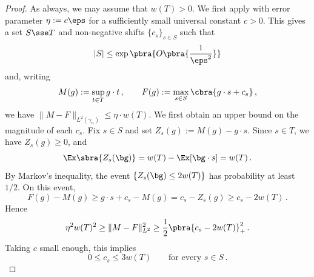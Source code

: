 \documentclass[11pt]{article}
\begin{document}
\begin{proof} 
	As always, we may assume that $w(T) > 0$. 
	We first apply  with error parameter $\eta:=c\eps$ for a sufficiently small universal constant $c>0$. 
	This gives a set $S\sse T$ and non-negative shifts $\{c_s\}_{s\in S}$ such that
	\[
		|S|
		\leq
		\exp\pbra{O\pbra{\frac1{\eps^2}}}
	\]
	and, writing
	\[
		M(g):=\sup_{t\in T}g\cdot t\,,
		\qquad
		F(g):=\max_{s\in S}\cbra{g\cdot s+c_s}\,,
	\]
	we have $\|M-F\|_{L^2(\gamma_n)} \leq \eta\cdot w(T)$. 
	We first obtain an upper bound on the magnitude of each $c_s$. 
	Fix $s\in S$ and set $Z_s(g):=M(g)-g\cdot s$.
	Since $s\in T$, we have $Z_s(g)\geq0$, and
	\[
		\Ex\sbra{Z_s(\bg)}
		=
		w(T)-\Ex[\bg\cdot s]
		=
		w(T)\,.
	\]
	By Markov's inequality, the event $\{Z_s(\bg)\leq2w(T)\}$ has probability at least $1/2$.
	On this event,
	\[
		F(g)-M(g)
		\geq
		g\cdot s+c_s-M(g)
		=
		c_s-Z_s(g)
		\geq
		c_s-2w(T)\,.
	\]
	Hence
	\[
		\eta^2 w(T)^2
		\geq
		\|M-F\|_{L^2}^2
		\geq
		\frac12\pbra{c_s-2w(T)}_+^2\,.
	\]
	Taking $c$ small enough, this implies
	\begin{equation} \label{eq:centered-shift-bound}
		0\leq c_s\leq 3w(T)
		\qquad\text{for every }s\in S\,.
	\end{equation}
	

\end{proof}
\end{document}
